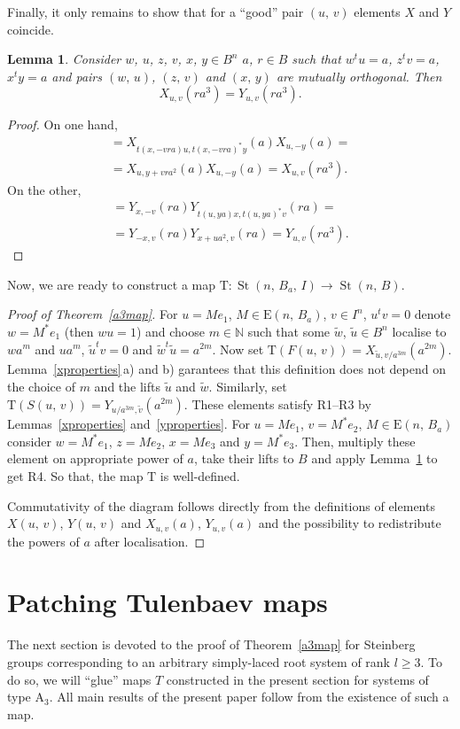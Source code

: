 \documentclass[11pt]{amsart}
\theoremstyle{plain} \declaretheorem[name=Theorem, Refname={Theorem,Theorems}]{tm} \Crefname{tm}{Theorem}{Theorems}
\numberwithin{equation}{section}
\newtheorem{lm}{Lemma} \numberwithin{lm}{section} \Crefname{lm}{Lemma}{Lemmas}
\theoremstyle{definition} \newtheorem{df}[lm]{Definition} \Crefname{df}{Definition}{Definitions}
\theoremstyle{remark} \newtheorem{rk}[lm]{Remark} \Crefname{rk}{Remark}{Remarks}
\newcommand{\E}{{\mathrm{E}}}
\newcommand{\St}{\mathop{\mathrm{St}}\nolimits}
\begin{document}
Finally, it only remains to show that for a ``good'' pair $(u,\,v)$ elements $X$ and $Y$ coincide.

\begin{lm}
\label{x=y}
Consider $w$, $u$, $z$, $v$, $x$, $y\in B^n$ $a$, $r\in B$ such that $w^tu=a$, $z^tv=a$, $x^ty=a$ and pairs $(w,\,u)$, $(z,\,v)$ and $(x,\,y)$ are mutually orthogonal. Then 
$$
X_{u,v}(ra^3)=Y_{u,v}(ra^3).
$$
\end{lm}

\begin{proof}
On one hand,
\begin{multline*}
[Y_{x,-v}(ra),\,X_{u,y}(a)]=X_{t(x,-vra)u,t(x,-vra)^*y}(a)X_{u,-y}(a)=\\
=X_{u,y+vra^2}(a)X_{u,-y}(a)=X_{u,v}(ra^3).
\end{multline*}
On the other,
\begin{multline*}
[Y_{x,-v}(ra),\,X_{u,y}(a)]=Y_{x,-v}(ra)Y_{t(u,ya)x,t(u,ya)^*v}(ra)=\\
=Y_{-x,v}(ra)Y_{x+ua^2,v}(ra)=Y_{u,v}(ra^3).
\end{multline*}
\end{proof}

Now, we are ready to construct a map 
$
\mathrm T\colon\St(n,\,B_a,\,I)\rightarrow\St(n,\,B).
$

\begin{proof}[Proof of Theorem~\ref{a3map}]
For $u=Me_1$, $M\in\E(n,\,B_a)$, $v\in I^n$, $u^tv=0$ denote $w=M^*e_1$ (then $wu=1$) and choose $m\in\mathbb N$ such that some $\tilde w$, $\tilde u\in B^n$ localise to $wa^m$ and $ua^m$, $\tilde u^tv=0$ and $\tilde w^t\tilde u=a^{2m}$. Now set $\mathrm T(F(u,\,v))=X_{\tilde u,v/a^{3m}}(a^{2m})$. Lemma~\ref{xproperties}\,a) and b) garantees that this definition does not depend on the choice of $m$ and the lifts $\tilde u$ and $\tilde w$. Similarly, set $\mathrm T(S(u,\,v))=Y_{u/a^{3m},\tilde v}(a^{2m})$. These elements satisfy R1--R3 by Lemmas~\ref{xproperties} and~\ref{yproperties}. For $u=Me_1$, $v=M^*e_2$, $M\in\E(n,\,B_a)$ consider $w=M^*e_1$, $z=Me_2$, $x=Me_3$ and $y=M^*e_3$. Then, multiply these element on appropriate power of $a$, take their lifts to $B$ and apply Lemma~\ref{x=y} to get R4. So that, the map $\mathrm T$ is well-defined.

Commutativity of the diagram follows directly from the definitions of elements $X(u,\,v)$, $Y(u,\,v)$ and $X_{u,v}(a)$, $Y_{u,v}(a)$ and the possibility to redistribute the powers of $a$ after localisation.
\end{proof}

\section{Patching Tulenbaev maps}\label{sec:patching}

The next section is devoted to the proof of Theorem~\ref{a3map} for Steinberg groups corresponding to an arbitrary simply-laced root system of rank $l\geq3$. To do so, we will ``glue'' maps $T$ constructed in the present section for systems of type $\mathrm A_3$. All main results of the present paper follow from the existence of such a map.

\printbibliography
\end{document}
